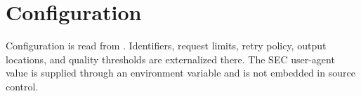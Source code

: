 \section{Configuration}


Configuration is read from .
Identifiers, request limits, retry policy, output locations, and quality
thresholds are externalized there. The SEC user-agent value is supplied through
an environment variable and is not embedded in source control.
